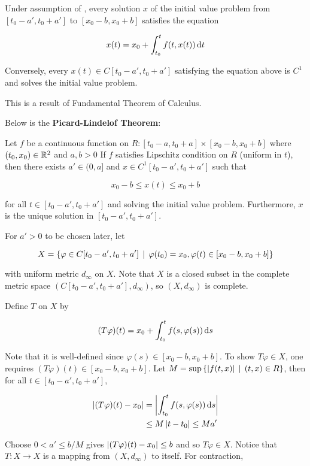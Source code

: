 \documentclass[a4paper,12pt]{article}
\begin{document}
\begin{pst}
  Under assumption of \rthm[\sctd{1}], every solution $x$ of the initial value problem from $[t_{0}-a',t_{0}+a']$ to $[x_{0}-b,x_{0}+b]$ satisfies the equation

  $$x(t)=x_{0}+\int_{t_{0}}^{t}f(t,x(t))\,\mathrm{d} t$$\s

  Conversely, every $x(t)\in C[t_{0}-a',t_{0}+a']$ satisfying the equation above is $C^{1}$ and solves the initial value problem.\n

  \prf This is a result of Fundamental Theorem of Calculus.
\end{pst}\n

Below is the \textbf{Picard-Lindelof Theorem}:\n

\begin{thm}
  Let $f$ be a continuous function on $R:[t_{0}-a,t_{0}+a]\times[x_{0}-b,x_{0}+b]$ where $(t_{0},x_{0})\in\mathbb{R}^{2}$ and $a,b>0$ If $f$ satisfies Lipschitz condition on $R$ (uniform in $t$), then there exists $a'\in(0,a]$ and $x\in C^{1}[t_{0}-a',t_{0}+a']$ such that

  $$x_{0}-b\leq x(t)\leq x_{0}+b$$\s

  for all $t\in[t_{0}-a',t_{0}+a']$ and solving the initial value problem. Furthermore, $x$ is the unique solution in $[t_{0}-a',t_{0}+a']$.\n

  \prf For $a'>0$ to be chosen later, let

  $$X=\left\{ \varphi\in C[t_{0}-a',t_{0}+a']\,\mid\,\varphi(t_{0})=x_{0},\varphi(t)\in[x_{0}-b,x_{0}+b]\right\}$$\s

  with uniform metric $d_{\infty}$ on $X$. Note that $X$ is a closed subset in the complete metric space $(C[t_{0}-a',t_{0}+a'],d_{\infty})$, so $(X,d_{\infty})$ is complete.\n

  Define $T$ on $X$ by

  $$(T\varphi)(t)=x_{0}+\int_{t_{0}}^{t}f(s,\varphi(s))\,\mathrm{d} s$$\s

  Note that it is well-defined since $\varphi(s)\in[x_{0}-b,x_{0}+b]$. To show $T\varphi\in X$, one requires $(T\varphi)(t)\in[x_{0}-b,x_{0}+b]$. Let $M=\sup\left\{ \left| f(t,x)\right|\,\mid\, (t,x)\in R\right\}$, then for all $t\in[t_{0}-a',t_{0}+a']$,

  $$\begin{aligned}[t]
    \left| (T\varphi)(t)-x_{0}\right|&=\left| \int_{t_{0}}^{t}f(s,\varphi(s))\,\mathrm{d} s\right|\\
    &\leq M\left| t-t_{0}\right|\leq Ma'
  \end{aligned}$$\s

  Choose $0<a'\leq b/M$ gives $\left| (T\varphi)(t)-x_{0}\right|\leq b$ and so $T\varphi\in X$. Notice that $T:X\to X$ is a mapping from $(X,d_{\infty})$ to itself. For contraction,


\end{thm}
\end{document}
